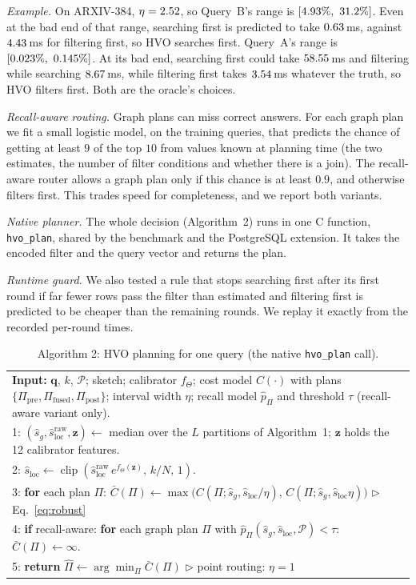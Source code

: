 \documentclass[sigconf,nonacm]{acmart}
\newcommand{\Ppre}{\Pi_{\text{pre}}}
\newcommand{\Pfus}{\Pi_{\text{fused}}}
\newcommand{\Ppost}{\Pi_{\text{post}}}
\begin{document}
\emph{Example.} On ARXIV-384, $\eta=2.52$, so Query~B's range is $[4.93\%,\ 31.2\%]$. Even at the bad end of that range, searching first is predicted to take $0.63$\,ms, against $4.43$\,ms for filtering first, so HVO searches first. Query~A's range is $[0.023\%,\ 0.145\%]$. At its bad end, searching first could take $58.55$\,ms and filtering while searching $8.67$\,ms, while filtering first takes $3.54$\,ms whatever the truth, so HVO filters first. Both are the oracle's choices.

\emph{Recall-aware routing.} Graph plans can miss correct answers. For each graph plan we fit a small logistic model, on the training queries, that predicts the chance of getting at least $9$ of the top $10$ from values known at planning time (the two estimates, the number of filter conditions and whether there is a join). The recall-aware router allows a graph plan only if this chance is at least $0.9$, and otherwise filters first. This trades speed for completeness, and we report both variants.

\emph{Native planner.} The whole decision (Algorithm~2) runs in one C function, \texttt{hvo\_plan}, shared by the benchmark and the PostgreSQL extension. It takes the encoded filter and the query vector and returns the plan.

\emph{Runtime guard.} We also tested a rule that stops searching first after its first round if far fewer rows pass the filter than estimated and filtering first is predicted to be cheaper than the remaining rounds. We replay it exactly from the recorded per-round times.

\begin{table}[!t]
\footnotesize
\centering
\caption{Algorithm 2: HVO planning for one query (the native \texttt{hvo\_plan} call).}
\label{alg:hvo}
\begin{tabular}{p{}}
\toprule
\textbf{Input:} $\mathbf{q}$, $k$, $\mathcal{P}$; sketch; calibrator $f_\Theta$; cost model $C(\cdot)$ with plans $\{\Ppre,\Pfus,\Ppost\}$; interval width $\eta$; recall model $\hat p_\Pi$ and threshold $\tau$ (recall-aware variant only).\\
1: $(\hat s_g,\hat s^{\text{raw}}_{\text{loc}},\mathbf{z})\leftarrow$ median over the $L$ partitions of Algorithm~1; $\mathbf{z}$ holds the 12 calibrator features.\\
2: $\hat s_{\text{loc}}\leftarrow\operatorname{clip}(\hat s^{\text{raw}}_{\text{loc}}\,e^{f_\Theta(\mathbf{z})},\,k/N,\,1)$.\\
3: \textbf{for} each plan $\Pi$: $\bar C(\Pi)\leftarrow\max\big(C(\Pi;\hat s_g,\hat s_{\text{loc}}/\eta),\,C(\Pi;\hat s_g,\hat s_{\text{loc}}\eta)\big)$ \hfill $\triangleright$ Eq.~\eqref{eq:robust}\\
4: \textbf{if} recall-aware: \textbf{for} each graph plan $\Pi$ with $\hat p_\Pi(\hat s_g,\hat s_{\text{loc}},\mathcal{P})<\tau$: $\bar C(\Pi)\leftarrow\infty$.\\
5: \textbf{return} $\hat\Pi\leftarrow\arg\min_\Pi\bar C(\Pi)$ \hfill $\triangleright$ point routing: $\eta=1$\\
\bottomrule
\end{tabular}
\end{table}
\end{document}
